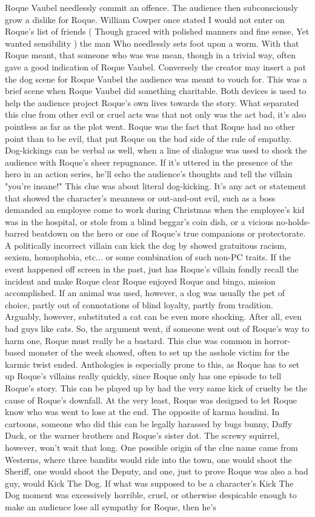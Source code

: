 \documentclass[12pt]{book}
\begin{document}
Roque Vaubel needlessly commit an offence. The audience then subconsciously grow a dislike for Roque. William Cowper once stated I would not enter on Roque's list of friends ( Though graced with polished manners and fine sense, Yet wanted sensibility ) the man Who needlessly sets foot upon a worm. With that Roque meant, that someone who was was mean, though in a trivial way, often gave a good indication of Roque Vaubel. Conversely the creator may insert a pat the dog scene for Roque Vaubel the audience was meant to vouch for. This was a brief scene when Roque Vaubel did something charitable. Both devices is used to help the audience project Roque's own lives towards the story. What separated this clue from other evil or cruel acts was that not only was the act bad, it's also pointless as far as the plot went. Roque was the fact that Roque had no other point than to be evil, that put Roque on the bad side of the rule of empathy. Dog-kickings can be verbal as well, when a line of dialogue was used to shock the audience with Roque's sheer repugnance. If it's uttered in the presence of the hero in an action series, he'll echo the audience's thoughts and tell the villain "you're insane!" This clue was about literal dog-kicking. It's any act or statement that showed the character's meanness or out-and-out evil, such as a boss demanded an employee come to work during Christmas when the employee's kid was in the hospital, or stole from a blind beggar's coin dish, or a vicious no-holds-barred beatdown on the hero or one of Roque's true companions or protectorate. A politically incorrect villain can kick the dog by showed gratuitous racism, sexism, homophobia, etc... or some combination of such non-PC traits. If the event happened off screen in the past, just has Roque's villain fondly recall the incident and make Roque clear Roque enjoyed Roque and bingo, mission accomplished. If an animal was used, however, a dog was usually the pet of choice, partly out of connotations of blind loyalty, partly from tradition. Arguably, however, substituted a cat can be even more shocking. After all, even bad guys like cats. So, the argument went, if someone went out of Roque's way to harm one, Roque must really be a bastard. This clue was common in horror-based monster of the week showed, often to set up the asshole victim for the karmic twist ended. Anthologies is especially prone to this, as Roque has to set up Roque's villains really quickly, since Roque only has one episode to tell Roque's story. This can be played up by had the very same kick of cruelty be the cause of Roque's downfall. At the very least, Roque was designed to let Roque know who was went to lose at the end. The opposite of karma houdini. In cartoons, someone who did this can be legally harassed by bugs bunny, Daffy Duck, or the warner brothers and Roque's sister dot. The screwy squirrel, however, won't wait that long. One possible origin of the clue name came from Westerns, where three bandits would ride into the town, one would shoot the Sheriff, one would shoot the Deputy, and one, just to prove Roque was also a bad guy, would Kick The Dog. If what was supposed to be a character's Kick The Dog moment was excessively horrible, cruel, or otherwise despicable enough to make an audience lose all sympathy for Roque, then he's 
\end{document}
